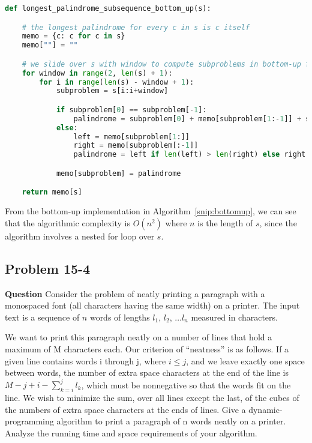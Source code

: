 \documentclass[]{book}
\theoremstyle{definition}
\begin{document}
    \clearpage

\begin{lstlisting}[language=Python, caption=Longest Palindrome Subsequence Bottom Up DP, label=snip:bottomup]
def longest_palindrome_subsequence_bottom_up(s):

    # the longest palindrome for every c in s is c itself
    memo = {c: c for c in s}
    memo[""] = ""

    # we slide over s with window to compute subproblems in bottom-up fashion
    for window in range(2, len(s) + 1):
        for i in range(len(s) - window + 1):
            subproblem = s[i:i+window]

            if subproblem[0] == subproblem[-1]:
                palindrome = subproblem[0] + memo[subproblem[1:-1]] + subproblem[-1]
            else:
                left = memo[subproblem[1:]]
                right = memo[subproblem[:-1]]
                palindrome = left if len(left) > len(right) else right

            memo[subproblem] = palindrome

    return memo[s]\end{lstlisting}

    From the bottom-up implementation in Algorithm~\ref{snip:bottomup},
    we can see that the algorithmic complexity is $O(n^2)$ where
    $n$ is the length of $s$, since the algorithm involves a nested for loop over $s$.

\subsection*{Problem 15-4}

\textbf{Question} 
    Consider the problem of neatly printing a paragraph with a monospaced font (all
    characters having the same width) on a printer. The input text is a sequence of
    $n$ words of lengths $l_1$, $l_2$, $\dots l_n$ measured in characters.

    We want to print this paragraph neatly on a number of lines that hold a 
    maximum of M characters each. 
    Our criterion of ``neatness'' is as follows. 
    If a given line contains words i through j, where $i \leq j$,
    and we leave exactly one space between words, the number of extra
    space characters at the end of the line is
    $M - j + i - \sum_{k=i}^j l_k$,
    which must be nonnegative so that the words fit on the line. 
    We wish to minimize the sum, over
    all lines except the last, of the cubes of the numbers of extra space characters at the
    ends of lines. Give a dynamic-programming algorithm to print a paragraph of n
    words neatly on a printer. Analyze the running time and space requirements of
    your algorithm.
\end{document}
